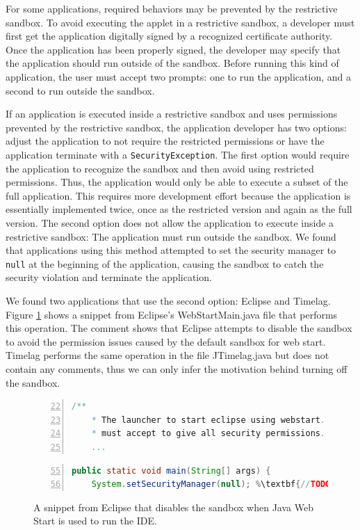 \documentclass{sig-alternate}
\begin{document}
For some applications, required behaviors may be prevented by the
restrictive sandbox. To avoid executing the applet in a restrictive
sandbox, a developer must first get the application digitally signed
by a recognized certificate authority. Once the application has been
properly signed, the developer may specify that the application should
run outside of the sandbox. Before running this kind of application,
the user must accept two prompts: one to run the application, and
a second to run outside the sandbox. 

If an application is executed inside a restrictive sandbox and uses
permissions prevented by the restrictive sandbox, the application
developer has two options: adjust the application to not require the
restricted permissions or have the application terminate with a \texttt{SecurityException}.
The first option would require the application to recognize the sandbox
and then avoid using restricted permissions. Thus, the application
would only be able to execute a subset of the full application. This
requires more development effort because the application is essentially
implemented twice, once as the restricted version and again as the
full version. The second option does not allow the application to
execute inside a restrictive sandbox: The application must run outside
the sandbox. We found that applications using this method attempted
to set the security manager to \texttt{null} at the beginning of the
application, causing the sandbox to catch the security violation and
terminate the application. 

We found two applications that use the second option: Eclipse and
Timelag. Figure \ref{fig:Eclipse-jws-snippet} shows a snippet from
Eclipse's WebStartMain.java file that performs this operation. The
comment shows that Eclipse attempts to disable the sandbox to avoid
the permission issues caused by the default sandbox for web start.
Timelag performs the same operation in the file JTimelag.java but
does not contain any comments, thus we can only infer the motivation
behind turning off the sandbox.
\begin{figure}
\begin{lstlisting}[language=Java,numbers=left,basicstyle={\scriptsize},breaklines=true,firstnumber=22,xrightmargin={0.1cm},numbersep={-10pt}]
    /** 
    * The launcher to start eclipse using webstart. To use this launcher, the client 
    * must accept to give all security permissions.
    ...
\end{lstlisting}


\begin{lstlisting}[language=Java,numbers=left,basicstyle={\scriptsize},breaklines=true,firstnumber=55,escapechar={\%},xrightmargin={0.1cm},numbersep={-10pt}]
    public static void main(String[] args) { 
    System.setSecurityManager(null); %\textbf{//TODO Hack so that when the classloader loading the fwk is created we don't have funny permissions. This should be revisited. }
\end{lstlisting}


\caption{A snippet from Eclipse that disables the sandbox when Java Web Start
is used to run the IDE.}
\label{fig:Eclipse-jws-snippet}
\end{figure}
\end{document}
